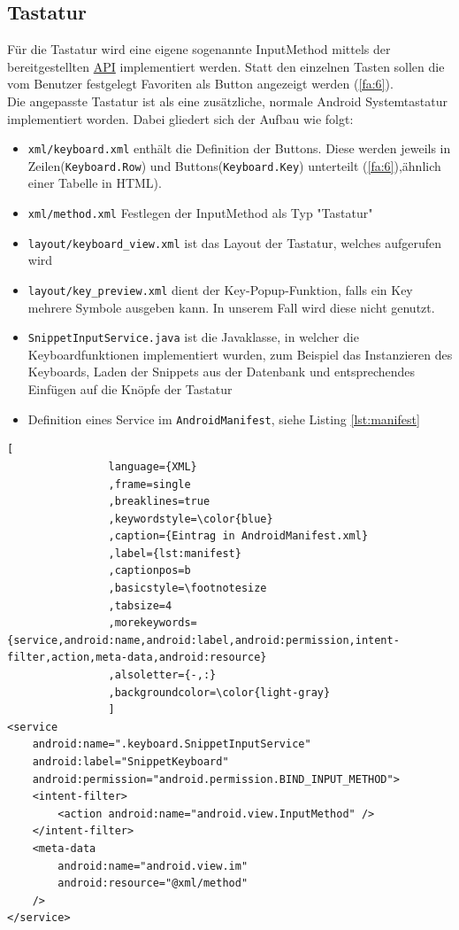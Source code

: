 \documentclass[11pt]{article}
\begin{document}
		
		\subsection{Tastatur}
			\noindent Für die Tastatur wird eine eigene sogenannte InputMethod mittels der bereitgestellten \href{https://developer.android.com/guide/topics/text/creating-input-method.html}{API} implementiert werden. Statt den einzelnen Tasten sollen die vom Benutzer festgelegt Favoriten als Button angezeigt werden (\ref{fa:6}).\\
		
			\noindent Die angepasste Tastatur ist als eine zusätzliche, normale Android Systemtastatur implementiert worden. Dabei gliedert sich der Aufbau wie folgt: 
			\begin{itemize}
				\item \texttt{xml/keyboard.xml} enthält die Definition der Buttons. Diese werden jeweils in Zeilen(\texttt{Keyboard.Row}) und Buttons(\texttt{Keyboard.Key}) unterteilt (\ref{fa:6}),ähnlich einer Tabelle in HTML).
				\item \texttt{xml/method.xml} Festlegen der InputMethod als Typ "Tastatur"
				\item \texttt{layout/keyboard\_view.xml} ist das Layout der Tastatur, welches aufgerufen wird
				\item \texttt{layout/key\_preview.xml} dient der Key-Popup-Funktion, falls ein Key mehrere Symbole ausgeben kann. In unserem Fall wird diese nicht genutzt.
				\item \texttt{SnippetInputService.java} ist die Javaklasse, in welcher die Keyboardfunktionen implementiert wurden, zum Beispiel das Instanzieren des Keyboards, Laden der Snippets aus der Datenbank und entsprechendes Einfügen auf die Knöpfe der Tastatur
				\item Definition eines Service im \texttt{AndroidManifest}, siehe Listing \ref{lst:manifest} 
			\end{itemize}
			
			\begin{lstlisting}[
				language={XML}
				,frame=single
				,breaklines=true
				,keywordstyle=\color{blue}
				,caption={Eintrag in AndroidManifest.xml}
				,label={lst:manifest}
				,captionpos=b
				,basicstyle=\footnotesize
				,tabsize=4
				,morekeywords={service,android:name,android:label,android:permission,intent-filter,action,meta-data,android:resource}
				,alsoletter={-,:}
				,backgroundcolor=\color{light-gray}
				]
<service
	android:name=".keyboard.SnippetInputService"
	android:label="SnippetKeyboard"
	android:permission="android.permission.BIND_INPUT_METHOD">
	<intent-filter>
		<action android:name="android.view.InputMethod" />
	</intent-filter>
	<meta-data
		android:name="android.view.im"
		android:resource="@xml/method"
	/>
</service>
			\end{lstlisting}
		
\end{document}
